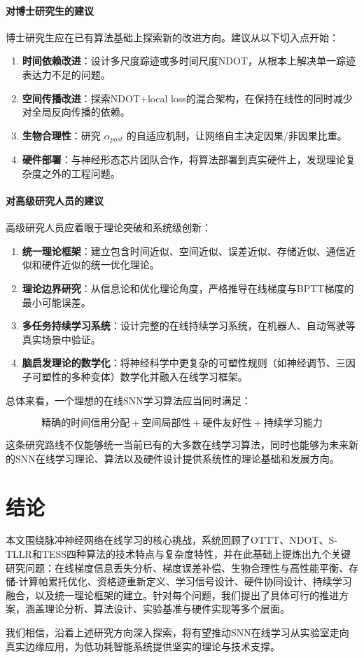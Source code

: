 \documentclass[journal,12pt,onecolumn]{IEEEtran}
\begin{document}
\paragraph{对博士研究生的建议}
博士研究生应在已有算法基础上探索新的改进方向。建议从以下切入点开始：
\begin{enumerate}
    \item \textbf{时间依赖改进}：设计多尺度踪迹或多时间尺度NDOT，从根本上解决单一踪迹表达力不足的问题。
    \item \textbf{空间传播改进}：探索NDOT+local loss的混合架构，在保持在线性的同时减少对全局反向传播的依赖。
    \item \textbf{生物合理性}：研究 \(\alpha_{post}\) 的自适应机制，让网络自主决定因果/非因果比重。
    \item \textbf{硬件部署}：与神经形态芯片团队合作，将算法部署到真实硬件上，发现理论复杂度之外的工程问题。
\end{enumerate}

\paragraph{对高级研究人员的建议}
高级研究人员应着眼于理论突破和系统级创新：
\begin{enumerate}
    \item \textbf{统一理论框架}：建立包含时间近似、空间近似、误差近似、存储近似、通信近似和硬件近似的统一优化理论。
    \item \textbf{理论边界研究}：从信息论和优化理论角度，严格推导在线梯度与BPTT梯度的最小可能误差。
    \item \textbf{多任务持续学习系统}：设计完整的在线持续学习系统，在机器人、自动驾驶等真实场景中验证。
    \item \textbf{脑启发理论的数学化}：将神经科学中更复杂的可塑性规则（如神经调节、三因子可塑性的多种变体）数学化并融入在线学习框架。
\end{enumerate}

总体来看，一个理想的在线SNN学习算法应当同时满足：

\[
\boxed{
\text{精确的时间信用分配} + \text{空间局部性} + \text{硬件友好性} + \text{持续学习能力}
}
\]

这条研究路线不仅能够统一当前已有的大多数在线学习算法，同时也能够为未来新的SNN在线学习理论、算法以及硬件设计提供系统性的理论基础和发展方向。

\section{结论}

本文围绕脉冲神经网络在线学习的核心挑战，系统回顾了OTTT、NDOT、S-TLLR和TESS四种算法的技术特点与复杂度特性，并在此基础上提炼出九个关键研究问题：在线梯度信息丢失分析、梯度误差补偿、生物合理性与高性能平衡、存储-计算帕累托优化、资格迹重新定义、学习信号设计、硬件协同设计、持续学习融合，以及统一理论框架的建立。针对每个问题，我们提出了具体可行的推进方案，涵盖理论分析、算法设计、实验基准与硬件实现等多个层面。

我们相信，沿着上述研究方向深入探索，将有望推动SNN在线学习从实验室走向真实边缘应用，为低功耗智能系统提供坚实的理论与技术支撑。



\end{document}
